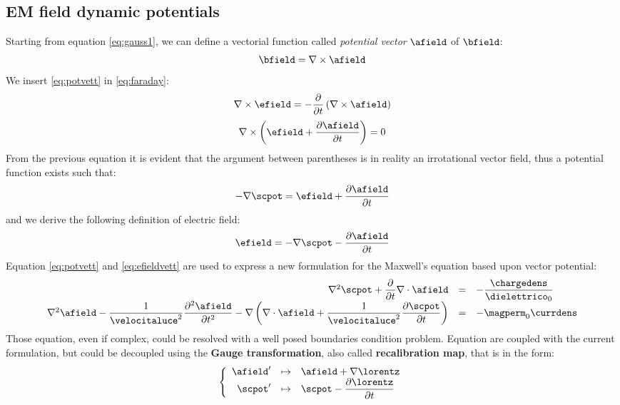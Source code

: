 \subsection{EM field dynamic potentials}

Starting from equation \ref{eq:gauss1}, we can define a vectorial function called \emph{potential vector} $\afield$ of $\bfield$:
\begin{equation}
\bfield = \nabla\times\afield
\label{eq:potvett}
\end{equation}
We insert \ref{eq:potvett} in \ref{eq:faraday}:
\[
\nabla\times\efield = - \partialt \left( \nabla\times\afield \right)
\]
\begin{equation}
\nabla\times\left( \efield + \partialtarg{\afield} \right) = 0
\end{equation}
From the previous equation it is evident that the argument between parentheses is in reality an irrotational vector field, thus a potential function exists such that:
\[
-\nabla\scpot = \efield + \partialtarg{\afield}
\]
and we derive the following definition of electric field:
\begin{equation}
\efield = - \nabla \scpot - \partialtarg{\afield}
\label{eq:efieldvett}
\end{equation}
Equation \ref{eq:potvett} and \ref{eq:efieldvett} are used to express a new formulation for the Maxwell's equation based upon vector potential:
\begin{equation}
\begin{array}{rcl}
\nabla^2\scpot + \partialt \nabla \cdot \afield & = & - \dfrac{\chargedens}{\dielettrico_0} \\
\nabla^2 \afield - \dfrac{1}{\velocitaluce^2} \partialttarg{\afield} - \nabla\left( \nabla \cdot \afield + \dfrac{1}{\velocitaluce^2} \partialtarg{\scpot} \right) & = & -\magperm_0 \currdens
\end{array}
\label{eq:potvecmaxwell}
\end{equation}
Those equation, even if complex, could be resolved with a well posed boundaries condition problem. Equation are coupled with the current formulation, but could be decoupled using the \textbf{Gauge transformation}, also called \textbf{recalibration map}, that is in the form:
\begin{equation}
\left\{ \begin{array}{rcl}
\afield' & \mapsto & \afield + \nabla \lorentz \\
\scpot' & \mapsto & \scpot - \partialtarg{\lorentz}
\end{array}
\right.
\end{equation}

